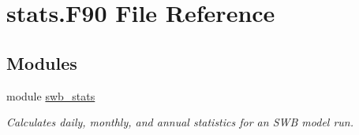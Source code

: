 \hypertarget{stats_8_f90}{
\section{stats.F90 File Reference}
\label{stats_8_f90}
}
\subsection*{Modules}
\begin{DoxyCompactItemize}
\item 
module \hyperlink{namespaceswb__stats}{swb\_\-stats}


\begin{DoxyCompactList}\small\item\em Calculates daily, monthly, and annual statistics for an SWB model run. \item\end{DoxyCompactList}

\end{DoxyCompactItemize}
